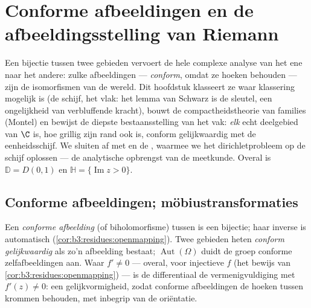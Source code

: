 \chapter{Conforme afbeeldingen en de afbeeldingsstelling van
Riemann}
\label{ch:b3:conformal}

Een  bijectie tussen twee gebieden vervoert de hele
complexe analyse van het ene naar het andere: zulke afbeeldingen
--- \emph{conform}, omdat ze hoeken behouden --- zijn de
isomorfismen van de  wereld. Dit hoofdstuk klasseert ze
waar klassering mogelijk is (de schijf, het vlak: het lemma van
Schwarz is de sleutel, een ongelijkheid van verbluffende kracht),
bouwt de compactheidstheorie van  families (Montel) en
bewijst de diepste bestaansstelling van het vak: \emph{elk}
 echt deelgebied van $\C$ is, hoe grillig
zijn rand ook is, conform gelijkwaardig met de eenheidsschijf. We
sluiten af met  en de , waarmee we
het dirichletprobleem op de schijf oplossen --- de analytische
opbrengst van de  meetkunde. Overal is $\mathbb D =
D(0,1)$ en $\mathbb H = \{\operatorname{Im}z > 0\}$.

\section{Conforme afbeeldingen; möbiustransformaties}

\begin{definition}\label{def:b3:conformal:conformal}
Een \emph{conforme afbeelding} (of
biholomorfisme) tussen  is een 
bijectie; haar inverse is automatisch 
(\cref{cor:b3:residues:openmapping}). Twee gebieden heten
\emph{conform gelijkwaardig} als zo'n afbeelding bestaat;
$\operatorname{Aut}(\Omega)$ duidt de groep conforme
zelfafbeeldingen aan. Waar $f' \neq 0$ --- overal, voor injectieve
$f$ (het bewijs van \cref{cor:b3:residues:openmapping}) --- is de
differentiaal de vermenigvuldiging met $f'(z) \neq 0$: een
gelijkvormigheid, zodat conforme afbeeldingen de hoeken tussen
krommen behouden, met inbegrip van de oriëntatie.
\end{definition}

